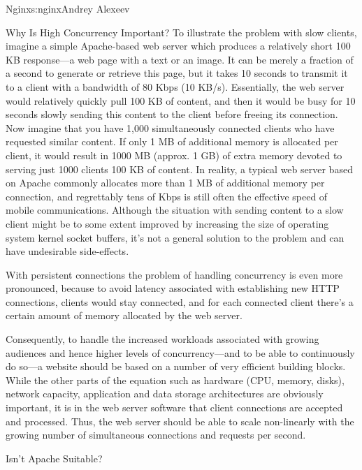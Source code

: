 \begin{aosachapter}{Nginx}{s:nginx}{Andrey Alexeev}
\begin{aosasect1}{Why Is High Concurrency Important?}
To illustrate the problem with slow clients, imagine a simple
Apache-based web server which produces a relatively short 100 KB
response---a web page with a text or an image. It can be merely a
fraction of a second to generate or retrieve this page, but it takes
10 seconds to transmit it to a client with a bandwidth of 80 Kbps (10
KB/s). Essentially, the web server would relatively quickly pull 100
KB of content, and then it would be busy for 10 seconds slowly sending
this content to the client before freeing its connection. Now imagine
that you have 1,000 simultaneously connected clients who have
requested similar content. If only 1 MB of additional memory is
allocated per client, it would result in 1000 MB (approx. 1 GB) of
extra memory devoted to serving just 1000 clients 100 KB of
content. In reality, a typical web server based on Apache commonly
allocates more than 1 MB of additional memory per connection, and
regrettably tens of Kbps is still often the effective speed of mobile
communications. Although the situation with sending content to a slow
client might be to some extent improved by increasing the size of
operating system kernel socket buffers, it's not a general solution to
the problem and can have undesirable side-effects.

With persistent connections the problem of handling concurrency is
even more pronounced, because to avoid latency associated with
establishing new HTTP connections, clients would stay connected, and
for each connected client there's a certain amount of memory allocated
by the web server.

Consequently, to handle the increased workloads associated with
growing audiences and hence higher levels of concurrency---and to be
able to continuously do so---a website should be based on a number of
very efficient building blocks. While the other parts of the equation
such as hardware (CPU, memory, disks), network capacity, application
and data storage architectures are obviously important, it is in the
web server software that client connections are accepted and
processed. Thus, the web server should be able to scale non-linearly
with the growing number of simultaneous connections and requests per
second.

\begin{aosasect2}{Isn't Apache Suitable?}


\end{aosasect2}
\end{aosasect1}
\end{aosachapter}
